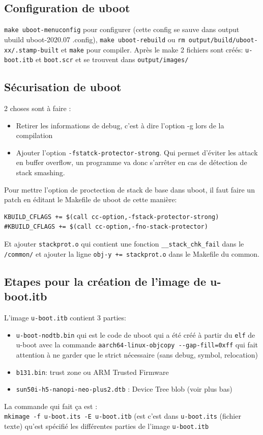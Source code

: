 \subsection{Configuration de uboot}
\verb!make uboot-menuconfig! pour configurer (cette config se sauve dans output ubuild uboot-2020.07 .config), \verb!make uboot-rebuild! ou \verb!rm output/build/uboot-xx/.stamp-built! et \verb!make! pour compiler. Après le make 2 fichiers sont créés: \verb!u-boot.itb! et \verb!boot.scr! et se trouvent dans \verb!output/images/!
\subsection{Sécurisation de uboot}
2 choses sont à faire :
\begin{itemize}
\item Retirer les informations de debug, c'est à dire l'option -g lors de la compilation
\item Ajouter l'option \verb!-fstatck-protector-strong!.  Qui permet d'éviter les attack en buffer overflow, un programme va donc s'arrêter en cas de détection de stack smashing.
\end{itemize}
Pour mettre l'option de proctection de stack de base dans uboot, il faut faire un patch en éditant le Makefile de uboot de cette manière:
\begin{lstlisting}[style=bash]
KBUILD_CFLAGS += $(call cc-option,-fstack-protector-strong)
#KBUILD_CFLAGS += $(call cc-option,-fno-stack-protector)
\end{lstlisting}
Et ajouter \verb!stackprot.o! qui contient une fonction \verb!__stack_chk_fail! dans le \verb!/common/! et ajouter la ligne \verb!obj-y += stackprot.o! dans le Makefile du common.
\subsection{Etapes pour la création de l'image de u-boot.itb}
L'image \verb!u-boot.itb! contient 3 parties:
\begin{itemize}
\item \verb!u-boot-nodtb.bin!  qui est le code de uboot qui a été créé à partir du \verb!elf! de u-boot avec la commande \verb!aarch64-linux-objcopy --gap-fill=0xff! qui fait attention à ne garder que le strict nécessaire (sans debug, symbol, relocation)
\item \verb!b131.bin!: trust zone ou ARM Trusted Firmware
\item \verb!sun50i-h5-nanopi-neo-plus2.dtb! : Device Tree blob (voir plus bas)
\end{itemize}
La commande qui fait ça est : \\ \verb!mkimage -f u-boot.its -E u-boot.itb! (est c'est dans \verb!u-boot.its! (fichier texte) qu'est spécifié les différentes parties de l'image \verb!u-boot.itb!

